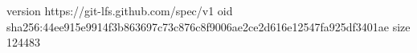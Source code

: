 version https://git-lfs.github.com/spec/v1
oid sha256:44ee915e9914f3b863697c73c876c8f9006ae2ce2d616e12547fa925df3401ae
size 124483
